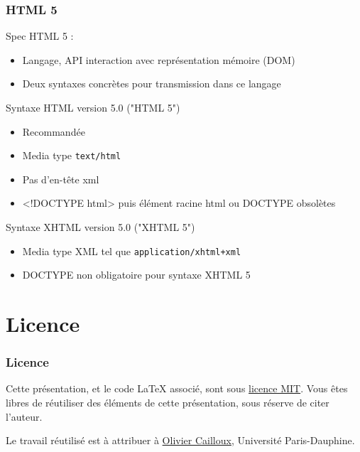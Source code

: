 \documentclass[english, french]{beamer}
\begin{document}
\begin{frame}
	\frametitle{HTML 5}
	Spec HTML 5 : 
	\begin{itemize}
		\item Langage, API interaction avec représentation mémoire (DOM)
		\item Deux syntaxes concrètes pour transmission dans ce langage
	\end{itemize}
	\begin{block}{Syntaxe HTML version 5.0 ("HTML 5")}
		\begin{itemize}
			\item Recommandée
			\item Media type \texttt{text/html}
			\item Pas d’en-tête xml
			\item{} <!DOCTYPE html> puis élément racine html {\tiny ou DOCTYPE obsolètes}%
		\end{itemize}
	\end{block}
	\begin{block}{Syntaxe XHTML version 5.0 ("XHTML 5")}
		\begin{itemize}
			\item Media type XML tel que \texttt{application/xhtml+xml}
			\item DOCTYPE non obligatoire pour syntaxe XHTML 5
		\end{itemize}
	\end{block}
\end{frame}

\section{Licence}
\begin{frame}
	\frametitle{Licence}
	Cette présentation, et le code LaTeX associé, sont sous \href{http://opensource.org/licenses/MIT}{licence MIT}. Vous êtes libres de réutiliser des éléments de cette présentation, sous réserve de citer l’auteur.
	
	Le travail réutilisé est à attribuer à \href{http://www.lamsade.dauphine.fr/~ocailloux/}{Olivier Cailloux}, Université Paris-Dauphine.
\end{frame}
\end{document}
